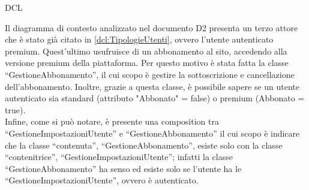 \begin{listaPersonale}{DCL}
\begin{listaPersonale2}[DCL]{}
        \begin{center}
            
        \end{center}
        \newpage


        Il diagramma di contesto analizzato nel documento D2 presenta un terzo attore che è stato già citato in \ref{dcl:TipologieUtenti}, ovvero l'utente autenticato premium. Quest'ultimo usufruisce di un abbonamento al sito, accedendo alla versione premium della piattaforma. Per questo motivo è stata fatta la classe “GestioneAbbonamento”, il cui scopo è gestire la sottoscrizione e cancellazione dell'abbonamento. Inoltre, grazie a questa classe, è possibile sapere se un utente autenticato sia standard (attributo "Abbonato" = false) o premium (Abbonato = true). \\
        Infine, come si può notare, è presente una composition tra “GestioneImpostazioniUtente” e “GestioneAbbonamento” il cui scopo è indicare che la classe “contenuta”, “GestioneAbbonamento”, esiste solo con la classe “contenitrice”, “GestioneImpostazioniUtente”; infatti la classe “GestioneAbbonamento” ha senso ed esiste solo se l'utente ha le “GestioneImpostazioniUtente”, ovvero è autenticato.


        \begin{center}
            
        \end{center}




\end{listaPersonale2}
\end{listaPersonale}
